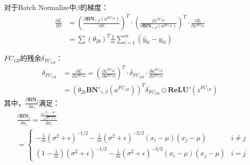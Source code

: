 \begin{solution}
\begin{enumerate}
        对于Batch Normalize中$\beta$的梯度：
        \begin{align*}
            \frac{\partial L}{\partial\beta} &= \left(\frac{\partial \textbf{BN}_{\gamma,\beta}(a^{FC_{1B}})}{\partial \beta}\right)^T \cdot \left(\frac{\partial z^{FC_{2B}}}{\partial\textbf{BN}_{\gamma,\beta}(a^{FC_{1B}})}\right)^T \cdot\frac{\partial L}{\partial z^{FC_{2B}}}\\
            &= \sum\left(\theta_{2b}\right)^T\frac{1}{m}\sum_{i=1}^{m}\left(\hat{y}_{bi}-y_{bi}\right)
        \end{align*}

        $FC_{1B}$的残余$\delta_{FC_{1B}}$：
        \begin{align*}
            \delta_{FC_{1B}} &= \frac{\partial L}{\partial z^{FC_{1B}}} 
            =\left(\frac{\partial z^{FC_{2B}}}{\partial a^{FC_{1B}}}\right)^T \cdot \delta_{FC_{2B}} \cdot \frac{\partial a^{FC_{1B}}}{\partial z^{FC_{1B}}}\\
            &=  \left(\theta_{2b}  \textbf{BN}'_{\gamma,\beta}(a^{FC_{1B}})\right)^T \delta_{FC_{2B}} \odot \textbf{ReLU}'(z^{FC_{1B}})
        \end{align*}
        其中，$\frac{\partial\textbf{BN}_j}{\partial x_i}$满足：
        {\small
        \begin{align*}
            &\frac{\partial\textbf{BN}_j}{\partial x_i} = \frac{\partial \frac{x_{j}-\mu}{\sqrt{\sigma^{2}+\epsilon}}}{\partial x_{i}}\\
            &=
            \begin{cases}
                -\frac{1}{m}\left(\sigma^{2}+\epsilon\right)^{-1 / 2}-\frac{1}{m}\left(\sigma^{2}+\epsilon\right)^{-3 / 2}\left(x_{i}-\mu\right)\left(x_{j}-\mu\right)& i\neq j\\
                \left(1-\frac{1}{m}\right)\left(\sigma^{2}+\epsilon\right)^{-1 / 2}-\frac{1}{m}\left(\sigma^{2}+\epsilon\right)^{-3 / 2}\left(x_{i}-\mu\right)\left(x_{j}-\mu\right)& i=j
            \end{cases}
        \end{align*}}
        

\end{enumerate}
\end{solution}
